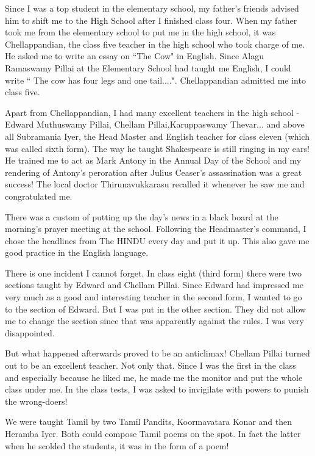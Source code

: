 Since I was a top student in the elementary school, my father's friends 
advised him to shift me to the High School after I finished class four. 
When my father took me from the elementary school to put me in the high 
school, it was Chellappandian, the class five teacher in the high school 
who took charge of me. He asked me to write an essay on ``The Cow" in 
English. Since Alagu Ramaswamy Pillai at the Elementary School had 
taught me English, I could write `` The cow has four legs and one 
tail....". Chellappandian admitted me into class five.

Apart from Chellappandian, I had many excellent teachers in the high 
school - Edward Muthuswamy Pillai, Chellam Pillai,\break Karuppaswamy 
Thevar... and above all Subramania Iyer, the Head Master and English 
teacher for class eleven (which was called sixth form). The way he 
taught Shakespeare is still ringing in my ears! He trained me to act as 
Mark Antony in the Annual Day of the School and my rendering of Antony's 
peroration after Julius Ceaser's assassination was a great success! The 
local doctor Thirunavukkarasu recalled it whenever he saw me and 
congratulated me.

There was a custom of putting up the day's news in a black board at the 
morning's prayer meeting at the school. Following the Headmaster's 
command, I chose the headlines from The HINDU every day and put it up. 
This also gave me good practice in the English language.

There is one incident I cannot forget. In class eight (third form) there 
were two sections taught by Edward and Chellam Pillai. Since Edward had 
impressed me very much as a good and interesting teacher in the second 
form, I wanted to go to the section of Edward. But I was put in the 
other section. They did not allow me to change the section since that 
was apparently against the rules. I was very disappointed.

But what happened afterwards proved to be an anticlimax! Chellam Pillai 
turned out to be an excellent teacher. Not only that. Since I was the 
first in the class and especially because he liked me, he made me the 
monitor and put the whole class under me. In the class tests, I was 
asked to invigilate with powers to punish the wrong-doers!

We were taught Tamil by two Tamil Pandits, Koormavatara Konar and then 
Heramba Iyer. Both could compose Tamil poems on the spot. In fact the 
latter when he scolded the students, it was in the form of a poem!

